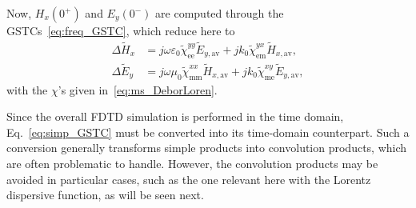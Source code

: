 \documentclass[journal]{IEEEtran}
\begin{document}
Now, $H_x(0^+)$ and $E_y(0^-)$ are computed through the GSTCs~\eqref{eq:freq_GSTC}, which reduce here to
\begin{subequations}\label{eq:simp_GSTC}
    \begin{align}
     \Delta \tilde{H}_x &= j\omega\varepsilon_0 \tilde{\chi}_\textrm{ee}^{yy}\tilde{E}_{y,\textrm{av}}+ jk_0 \tilde{\chi}_\textrm{em}^{yx}\tilde{H}_{x,\textrm{av}},\label{eq:simp_GSTC_1} \\
     \Delta \tilde{E}_y &= j\omega\mu_0 \tilde{\chi}_\textrm{mm}^{xx}\tilde{H}_{x,\textrm{av}}+ jk_0 \tilde{\chi}_\textrm{me}^{xy}\tilde{E}_{y,\textrm{av}},\label{eq:simp_GSTC_2}
   \end{align}
\end{subequations}
with the $\chi$'s given in~\eqref{eq:ms_DeborLoren}.

Since the overall FDTD simulation is performed in the time domain, Eq.~\eqref{eq:simp_GSTC} must be converted into its time-domain counterpart. Such a conversion generally transforms simple products into convolution products, which are often problematic to handle. However, the convolution products may be avoided in particular cases, such as the one relevant here with the Lorentz dispersive function, as will be seen next.

\end{document}

